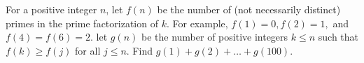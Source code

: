 For a positive integer $n$,  let $f(n)$ be the number of (not necessarily distinct) primes in the prime factorization of $k$. For example, $f(1) = 0, f(2) = 1, $ and $f(4) = f(6) = 2$. let $g(n)$ be the number of positive integers $k \leq n$ such that $f(k) \geq f(j)$ for all $j \leq n$. Find $g(1) + g(2) + \ldots + g(100)$.